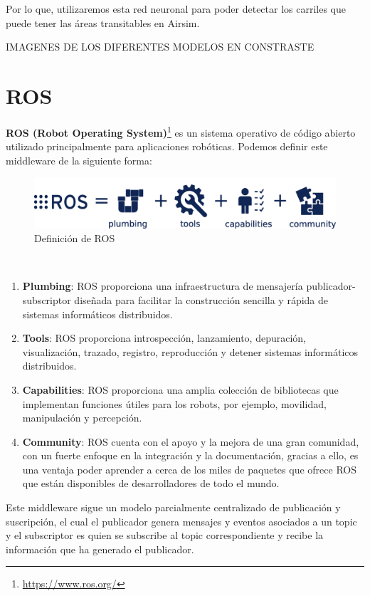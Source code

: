 Por lo que, utilizaremos esta red neuronal para poder detectar los carriles que puede tener las áreas transitables en Airsim.

IMAGENES DE LOS DIFERENTES MODELOS EN CONSTRASTE
\section{ROS}
\label{sec:ros}
\textbf{ROS (Robot Operating System)}\footnote{\url{https://www.ros.org/}} es un sistema operativo de código abierto utilizado principalmente para aplicaciones robóticas. 
Podemos definir este middleware de la siguiente forma:

\begin{figure} [H]
    \begin{center}
      \includegraphics[scale=0.18]{figs/Plataformas_Desarollo/ros-equation.png}
    \end{center}
    \caption{Definición de ROS}
    \label{fig:ROS}
  \end{figure}\


\begin{enumerate}
    \item \textbf{Plumbing}: ROS proporciona una infraestructura de mensajería publicador-subscriptor diseñada para facilitar la construcción sencilla y rápida de sistemas informáticos
    distribuidos.
    \item \textbf{Tools}: ROS proporciona introspección, lanzamiento, depuración, visualización, trazado, registro, reproducción y detener sistemas informáticos distribuidos.
    \item \textbf{Capabilities}: ROS proporciona una amplia colección de bibliotecas que implementan funciones útiles para los robots, por ejemplo, movilidad, manipulación y percepción.
    \item \textbf{Community}: ROS cuenta con el apoyo y la mejora de una gran comunidad, con un fuerte enfoque en la integración y la documentación, gracias a ello, es una ventaja poder
    aprender a cerca de los miles de paquetes que ofrece ROS que están disponibles de desarrolladores de todo el mundo.
\end{enumerate}

Este middleware sigue un modelo parcialmente centralizado de publicación y suscripción, el cual el publicador genera mensajes y eventos asociados a un topic y el subscriptor
es quien se subscribe al topic correspondiente y recibe la información que ha generado el publicador. \newline

